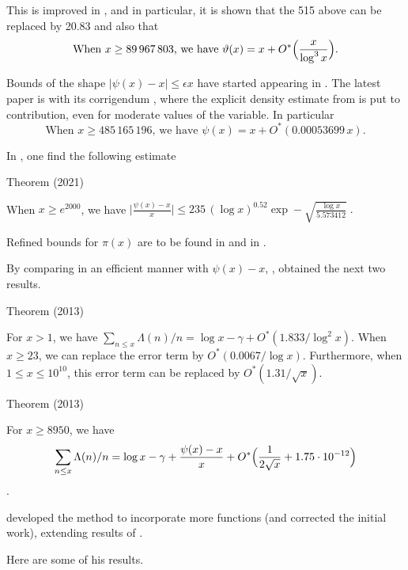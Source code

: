 This is improved in
\cite{Dusart*16},
and in particular, it is shown that the 515 above can be replaced by
20.83 and also that
$$
\text{When $x\ge 89\,967\,803$, we have } \vartheta(x)=x+O^*\Bigl(\frac{x}{\log^3
x}\Bigr).
$$

Bounds of the shape $|\psi(x)-x|\le \epsilon x$ have started appearing
in
\cite{Rosser-Schoenfeld*62}.
The latest paper is
\cite{Kadiri-Faber*13}
with its corrigendum
\cite{Kadiri-Faber*18},
where the explicit density estimate from
\cite{Kadiri*13}
is put to contribution, even for moderate
values of the variable. In particular
$$
\text{When $x\ge 485\,165\,196$, we have } \psi(x)=x+O^*(0.00053699\,x).
$$

In
\cite{Platt-Trudgian*21b},
one find the following estimate
\par 
\begin{thm}{Theorem (2021)}

  When $x\ge e^{2000}$, we have
  $\biggl|\frac{\psi(x)-x}{x}\biggr|\le 235\,(\log
  x)^{0.52}\exp-\sqrt{\frac{\log x}{5.573412}}\;.$



Refined bounds for $\pi(x)$ are to be found in
\cite{Panaitopol*00}
and in
\cite{Axler*16}.



By comparing in an efficient manner with $\psi(x)-x$,
\cite{Ramare*12-1},
obtained the next two results.

\par 
Theorem (2013)


  For $x > 1$, we have
  $\sum_{n\le x}\Lambda(n)/n=\log x-\gamma+O^*(1.833/\log^2x)$.
  When $x\ge 23$, we can replace the error term by $O^*(0.0067/\log
  x)$.
  Furthermore, when $1\le x\le 10^{10}$, this error term can be
  replaced by $O^*(1.31/\sqrt{x})$. 
\end{thm}


\par 
\begin{thm}{Theorem (2013)}

  For $x\ge 8950$, we have
  $$
  \sum_{n\le x}\Lambda(n)/n=\log x-\gamma
  +\frac{\psi(x)-x}{x}+O^*\Bigl(\frac{1}{2\sqrt{x}}+1.75\cdot 10^{-12}\Bigl)
  $$.
\end{thm}



\cite{Vanlalnagaia*15-1}
developed the method to incorporate more functions (and corrected the
initial work), extending results of
\cite{Rosser-Schoenfeld*62}.

Here are some of his results.


